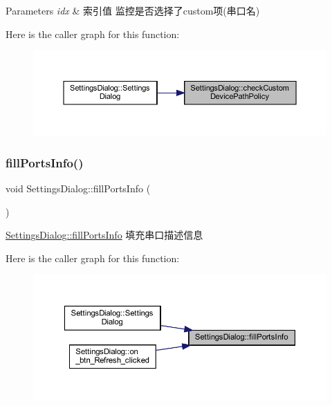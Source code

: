 \begin{DoxyParams}{Parameters}
{\em idx} & 索引值 监控是否选择了custom项(串口名) \\
\hline
\end{DoxyParams}
Here is the caller graph for this function\+:
\nopagebreak
\begin{figure}[H]
\begin{center}
\leavevmode
\includegraphics[width=350pt]{class_settings_dialog_a5b561a34cba1fba972081978f3da0a4a_icgraph}
\end{center}
\end{figure}
\mbox{\label{class_settings_dialog_a9e2b682d0cfe9f8a16b7912f495aa034}} 
\subsubsection{\texorpdfstring{fillPortsInfo()}{fillPortsInfo()}}
{\footnotesize\ttfamily void Settings\+Dialog\+::fill\+Ports\+Info (\begin{DoxyParamCaption}{ }\end{DoxyParamCaption})\hspace{0.3cm}{\ttfamily [private]}}



\mbox{\hyperlink{class_settings_dialog_a9e2b682d0cfe9f8a16b7912f495aa034}{Settings\+Dialog\+::fill\+Ports\+Info}} 填充串口描述信息 

Here is the caller graph for this function\+:
\nopagebreak
\begin{figure}[H]
\begin{center}
\leavevmode
\includegraphics[width=350pt]{class_settings_dialog_a9e2b682d0cfe9f8a16b7912f495aa034_icgraph}
\end{center}
\end{figure}
\mbox{\label{class_settings_dialog_ac2a0ea7c05f7cb98e3bc2474981bc5e7}} 
